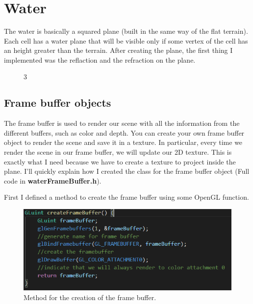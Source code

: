 \section{Water}
The water is basically a squared plane (built in the same way of the flat terrain). Each cell has a water plane that will be visible only if some vertex of the cell has an height greater than the terrain.
After creating the plane, the first thing I implemented was the reflaction and the refraction on the plane.

\begin{figure}[hbt!]
	\centering
	\qquad
	\caption{}3
\end{figure}

\subsection{Frame buffer objects}
The frame buffer is used to render our scene with all the information from the different buffers, such as color and depth. You can create your own frame buffer object to render the scene and save it in a texture. In particular, every time we render the scene in our frame buffer, we will update our 2D texture. This is exactly what I need because we have to create a texture to project inside the plane.
I'll quickly explain how I created the class for the frame buffer object (Full code in \textbf{waterFrameBuffer.h}).

\newpage

\noindent
First I defined a method to create the frame buffer using some OpenGL function.

\begin{figure}[hbt!]
	\centering
	\includegraphics[width= 1
	\textwidth]{images/FBO1.png}
	\caption{Method for the creation of the frame buffer.}
\end{figure} 

